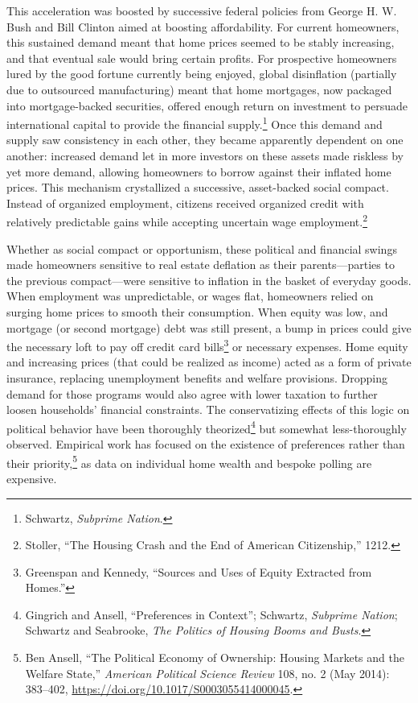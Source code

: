 \documentclass[12pt,oneside]{psthesis}
\begin{document}
This acceleration was boosted by successive federal policies from George H. W. Bush and Bill Clinton aimed at boosting affordability.
For current homeowners, this sustained demand meant that home prices seemed to be stably increasing, and that eventual sale would bring certain profits.
For prospective homeowners lured by the good fortune currently being enjoyed, global disinflation (partially due to outsourced manufacturing) meant that home mortgages, now packaged into mortgage-backed securities, offered enough return on investment to persuade international capital to provide the financial supply.\footnote{Schwartz, \emph{Subprime Nation}.}
Once this demand and supply saw consistency in each other, they became apparently dependent on one another: increased demand let in more investors on these assets made riskless by yet more demand, allowing homeowners to borrow against their inflated home prices.
This mechanism crystallized a successive, asset-backed social compact.
Instead of organized employment, citizens received organized credit with relatively predictable gains while accepting uncertain wage employment.\footnote{Stoller, ``The Housing Crash and the End of American Citizenship,'' 1212.}

Whether as social compact or opportunism, these political and financial swings made homeowners sensitive to real estate deflation as their parents---parties to the previous compact---were sensitive to inflation in the basket of everyday goods.
When employment was unpredictable, or wages flat, homeowners relied on surging home prices to smooth their consumption.
When equity was low, and mortgage (or second mortgage) debt was still present, a bump in prices could give the necessary loft to pay off credit card bills\footnote{Greenspan and Kennedy, ``Sources and Uses of Equity Extracted from Homes.''} or necessary expenses.
Home equity and increasing prices (that could be realized as income) acted as a form of private insurance, replacing unemployment benefits and welfare provisions.
Dropping demand for those programs would also agree with lower taxation to further loosen households' financial constraints.
The conservatizing effects of this logic on political behavior have been thoroughly theorized\footnote{Gingrich and Ansell, ``Preferences in Context''; Schwartz, \emph{Subprime Nation}; Schwartz and Seabrooke, \emph{The Politics of Housing Booms and Busts}.} but somewhat less-thoroughly observed.
Empirical work has focused on the existence of preferences rather than their priority,\footnote{Ben Ansell, ``The Political Economy of Ownership: Housing Markets and the Welfare State,'' \emph{American Political Science Review} 108, no. 2 (May 2014): 383--402, \url{https://doi.org/10.1017/S0003055414000045}.} as data on individual home wealth and bespoke polling are expensive.
\end{document}
